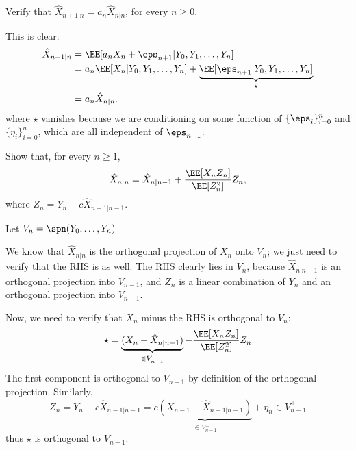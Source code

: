 \documentclass{scrartcl}
\begin{document}
\begin{prob}
    Verify that $\hat{X}_{n+1|n} = a_n\hat{X}_{n|n}$, for every $n \geq 0$.
\end{prob}

This is clear:
\begin{align*}
    \hat{X}_{n+1|n} &= \EE[a_nX_n + \eps_{n+1}|Y_0, Y_1, \ldots, Y_n]\\
    &= a_n\EE[X_n|Y_0, Y_1, \ldots, Y_n] + \underbrace{\EE[\eps_{n+1}|Y_0, Y_1, \ldots, Y_n]}_\star \\
    &= a_n\hat{X}_{n|n}.
\end{align*}
where $\star$ vanishes because we are conditioning on some function of $\{\eps_{i}\}_{i=0}^n$ and $\{\eta_{i}\}_{i=0}^n$, which are all independent of $\eps_{n+1}$.

\begin{prob}
    Show that, for every $n \geq 1$,
    \[\hat{X}_{n|n} = \hat{X}_{n|n-1} + \frac{\EE[X_nZ_n]}{\EE[Z_n^2]}Z_n,\]
    where $Z_n = Y_n - c\hat{X}_{n-1|n-1}$.
\end{prob}


Let $V_n = \spn(Y_0, \ldots, Y_n)$.

We know that $\hat{X}_{n | n}$ is the orthogonal projection of $X_n$ onto $V_n$; we just need to verify that the RHS is as well. The RHS clearly lies in $V_n$, because $\hat{X}_{n | n-1}$ is an orthogonal projection into $V_{n-1}$, and $Z_n$ is a linear combination of $Y_n$ and an orthogonal projection into $V_{n-1}$.

Now, we need to verify that $X_n$ minus the RHS is orthogonal to $V_n$:
\[
    \star = \underbrace{(X_n - \hat{X}_{n|n-1})}_{\in V_{n-1}^\perp} - \frac{\EE[X_nZ_n]}{\EE[Z_n^2]}Z_n 
\]
The first component is orthogonal to $V_{n-1}$ by definition of the orthogonal projection. Similarly,
\[
    Z_n = Y_n - c\hat{X}_{n-1|n-1} = c\underbrace{\left(X_{n-1} - \hat{X}_{n-1|n-1} \right)}_{\in V_{n-1}^\perp} + \eta_n \in V_{n-1}^\perp
\]
thus $\star$ is orthogonal to $V_{n-1}$.
\end{document}
